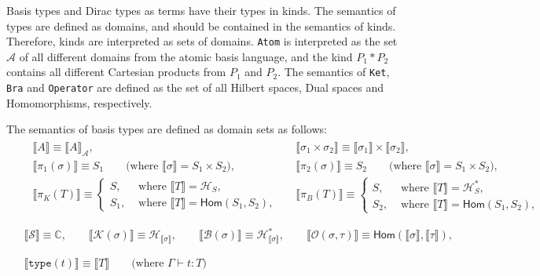 \documentclass[manuscript, review, timestamp]{acmart}
\newcommand*{\Sc}{\mathcal{S}}
\newcommand*{\K}{\mathcal{K}}
\newcommand*{\B}{\mathcal{B}}
\newcommand*{\Op}{\mathcal{O}}
\newcommand*{\sem}[1]{\llbracket #1 \rrbracket}
\begin{document}
Basis types and Dirac types as terms have their types in kinds. The semantics of types are defined as domains, and should be contained in the semantics of kinds. Therefore, kinds are interpreted as sets of domains. \texttt{Atom} is interpreted as the set $\mathcal{A}$ of all different domains from the atomic basis language, and the kind $P_1 * P_2$ contains all different Cartesian products from $P_1$ and $P_2$. The semantics of \texttt{Ket}, \texttt{Bra} and \texttt{Operator} are defined as the set of all Hilbert spaces, Dual spaces and Homomorphisms, respectively.


\begin{definition}
  The semantics of basis types are defined as domain sets as follows:
  \begin{align*}
    & \begin{aligned}
      & \sem{A} \equiv \sem{A}_\mathcal{A},
      \qquad
      && \sem{\sigma_1 \times \sigma_2} \equiv \sem{\sigma_1} \times \sem{\sigma_2}, \\
      & \sem{\pi_1(\sigma)} \equiv S_1 \qquad \text{(where $\sem{\sigma} = S_1 \times S_2$)},
      && \sem{\pi_2(\sigma)} \equiv S_2 \qquad \text{(where $\sem{\sigma} = S_1 \times S_2$)}, \\
      & \sem{\pi_K(T)} \equiv \left\{
        \begin{array}{ll}
          S, & \text{ where } \sem{T} = \mathcal{H}_S, \\
          S_1, & \text{ where } \sem{T} = \textsf{Hom}(S_1, S_2),
        \end{array}
      \right.
      && \sem{\pi_B(T)} \equiv \left\{
        \begin{array}{ll}
          S, & \text{ where } \sem{T} = \mathcal{H}^*_S, \\
          S_2, & \text{ where } \sem{T} = \textsf{Hom}(S_1, S_2),
        \end{array}
      \right.
    \end{aligned} \\
    \\
    & \begin{aligned}
      \sem{\Sc} \equiv \mathbb{C},
      \qquad
      \sem{\K(\sigma)} \equiv \mathcal{H}_{\sem{\sigma}}, 
      \qquad 
      \sem{\B(\sigma)} \equiv \mathcal{H}^*_{\sem{\sigma}},
      \qquad
      \sem{\Op(\sigma, \tau)} \equiv \textsf{Hom}(\sem{\sigma}, \sem{\tau}),
    \end{aligned} \\
    \\
    & \begin{aligned}
      \sem{\texttt{type}(t)} \equiv \sem{T} \qquad \text{(where $\Gamma \vdash t : T$)}
    \end{aligned}
  \end{align*}
\end{definition}
\end{document}
